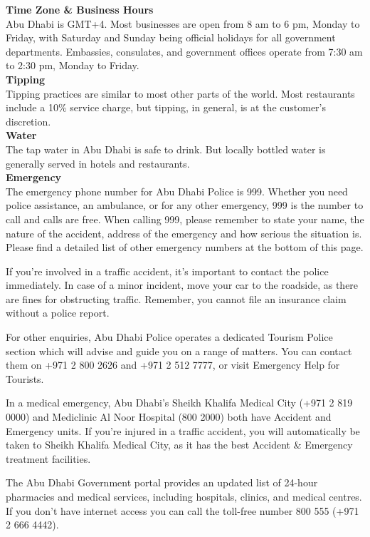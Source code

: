 {\large \textbf{Time Zone \& Business Hours}}\\
Abu Dhabi is GMT+4. Most businesses are open from 8 am to 6 pm, Monday to Friday,
 with Saturday and Sunday being official holidays for all government departments. 
Embassies, consulates, and government offices operate from 7:30 am to 2:30 pm, Monday to Friday.\\

{\large \textbf{Tipping}}\\
Tipping practices are similar to most other parts of the world. 
Most restaurants include a 10\% service charge, but tipping, in general, is at the customer’s discretion.\\

{\large \textbf{Water}}\\
The tap water in Abu Dhabi is safe to drink. But locally bottled water is generally served in hotels and restaurants.\\

{\large \textbf{Emergency}\\}
The emergency phone number for Abu Dhabi Police is 999. 
Whether you need police assistance, an ambulance, or for any other emergency, 999 is the number to call and calls are free. 
When calling 999, please remember to state your name, the nature of the accident, address of the emergency and how serious the situation is. 
Please find a detailed list of other emergency numbers at the bottom of this page.

If you’re involved in a traffic accident, it’s important to contact the police immediately. 
In case of a minor incident, move your car to the roadside, as there are fines for obstructing traffic. 
Remember, you cannot file an insurance claim without a police report.

For other enquiries, Abu Dhabi Police operates a dedicated Tourism Police section which will advise and guide you on a range of matters. 
You can contact them on +971 2 800 2626 and +971 2 512 7777, or visit Emergency Help for Tourists.

In a medical emergency, Abu Dhabi’s Sheikh Khalifa Medical City (+971 2 819 0000) and Mediclinic Al Noor Hospital (800 2000) both have Accident and Emergency units. 
If you’re injured in a traffic accident, you will automatically be taken to Sheikh Khalifa Medical City, as it has the best Accident \& Emergency treatment facilities.

The Abu Dhabi Government portal provides an updated list of 24-hour pharmacies and medical services, including hospitals, clinics, and medical centres. 
If you don’t have internet access you can call the toll-free number 800 555 (+971 2 666 4442).\\


